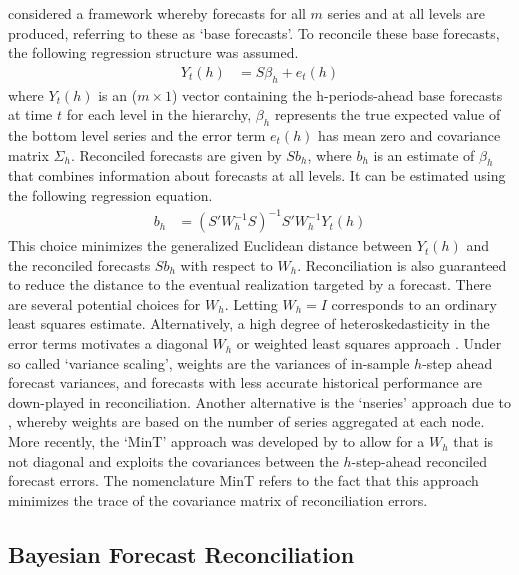 \documentclass[a4paper,fleqn,11pt]{article}
\begin{document}
\cite{Hyndman2011} considered a framework whereby forecasts for all $m$ series and at all levels are produced, referring to these as `base forecasts'. To reconcile these base forecasts, the following regression structure was assumed.
\begin{align}
	Y_t(h) &= S\beta_{h} + e_t(h)
	\label{eq:regstruct}
\end{align}
where $Y_t(h)$ is an ($m \times 1$) vector containing the h-periods-ahead base forecasts at time $t$ for each level in the hierarchy, $\beta_{h}$ represents the true expected value of the bottom level series and the error term $e_t(h)$ has mean zero and covariance matrix $\Sigma_h$. Reconciled forecasts are given by $Sb_{h}$, where $b_h$ is an estimate of $\beta_{h}$ that combines information about forecasts at all levels. It can be estimated using the following regression equation.
\begin{align}
	\label{eq:reg}
	b_{h} &= \left(S'W_h^{-1}S \right)^{-1} S'W_h^{-1}Y_t(h)
\end{align}
This choice minimizes the generalized Euclidean distance between $Y_t(h)$ and the reconciled forecasts $Sb_{h}$ with respect to $W_h$. Reconciliation is also guaranteed to reduce the distance to the eventual realization targeted by a forecast. There are several potential choices for $W_h$. Letting $W_h=I$ corresponds to an ordinary least squares estimate. Alternatively, a high degree of heteroskedasticity in the error terms motivates a diagonal $W_h$ or weighted least squares approach \citep{Hyndman2016}. Under so called `variance scaling', weights are the variances of in-sample $h$-step ahead forecast variances, and forecasts with less accurate historical performance are down-played in reconciliation. Another alternative is the `nseries' approach due to \cite{Athanasopoulos2017}, whereby weights are based on the number of series aggregated at each node. More recently, the `MinT' approach was developed by \cite{Wickramasuriya2015} to allow for a $W_h$ that is not diagonal and exploits the covariances between the $h$-step-ahead reconciled forecast errors. The nomenclature MinT refers to the fact that this approach minimizes the trace of the covariance matrix of reconciliation errors.

\subsection{Bayesian Forecast Reconciliation}\label{sec:model}
\end{document}
